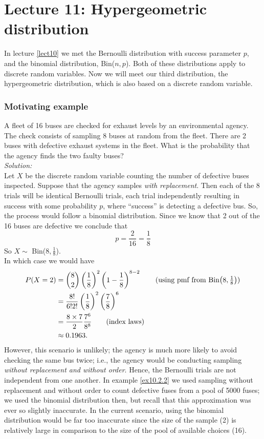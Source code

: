 \chapter{Lecture 11: Hypergeometric distribution}
In lecture \ref{lect10} we met the Bernoulli distribution with success parameter $p$, and the binomial distribution, Bin($n,p$). Both of these distributions apply to discrete random variables. Now we will meet our third distribution, the hypergeometric distribution, which is also based on a discrete random variable. 

\subsection{Motivating example} \label{ex11.1}
A fleet of 16 buses are checked for exhaust levels by an environmental agency. The check consists of sampling 8 buses at random from the fleet. There are 2 buses with defective exhaust systems in the fleet. What is the probability that the agency finds the two faulty buses? \\

\noindent \textit{Solution:} \\
Let $X$ be the discrete random variable counting the number of defective buses inspected. Suppose that the agency samples \textit{with replacement}. Then each of the 8 trials will be identical Bernoulli trials, each trial independently resulting in success with some probability $p$, where ``success'' is detecting a defective bus. So, the process would follow a binomial distribution. Since we know that 2 out of the 16 buses are defective we conclude that
\[
p = \frac{2}{16} = \frac{1}{8}
\]
So $X \sim$ Bin($8,\frac{1}{8}$). \\

\noindent In which case we would have
\begin{align*}
P(X = 2) & = \binom{8}{2}\bfrac{1}{8}^2\brac{1-\frac{1}{8}}^{8-2} \tag{using pmf from Bin$\brac{8,\frac{1}{8}}$}\\
	      & = \frac{8!}{6!2!}\bfrac{1}{8}^2\bfrac{7}{8}^6 \\
	      & = \frac{8\times 7}{2} \frac{7^6}{8^8} \tag{index laws} \\
	      & \approx 0.1963.
\end{align*}
However, this scenario is unlikely; the agency is much more likely to avoid checking the same bus twice; i.e., the agency would be conducting sampling \textit{without replacement and without order}. Hence, the Bernoulli trials are not independent from one another. In example \ref{ex10.2.2} we used sampling without replacement and without order to count defective fuses from a pool of 5000 fuses; we used the binomial distribution then, but recall that this approximation was ever so slightly inaccurate. In the current scenario, using the binomial distribution would be far too inaccurate since the size of the sample (2) is relatively large in comparison to the size of the pool of available choices (16). \\

